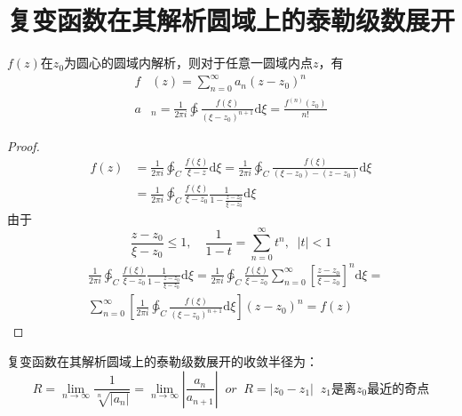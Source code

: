 \documentclass[10pt, a4paper, oneside]{ctexbook}
\def\D{\mathrm{d}}
\newcommand{\F}[1][z]
{\ensuremath{f(#1)}}
\begin{document}
\section{复变函数在其解析圆域上的泰勒级数展开}
    $\F$在$z_0$为圆心的圆域内解析，则对于任意一圆域内点$z$，有
    \begin{align*}
        f&(z)=\sum_{n=0}^\infty a_n(z-z_0)^n\\
        a&_n=\frac{1}{2\pi i}\ointctrclockwise \frac{\F[\xi]}{(\xi-z_0)^{n+1}}\D \xi=\frac{f^{(n)}(z_0)}{n!}
    \end{align*}
\begin{proof}
    \begin{align*}
        \F&=\frac{1}{2\pi i}\ointctrclockwise_C \frac{\F[\xi]}{\xi-z}\D \xi=\frac{1}{2\pi i}\ointctrclockwise_C \frac{\F[\xi]}{(\xi-z_0)-(z-z_0)}\D \xi\\
        &=\frac{1}{2\pi i}\ointctrclockwise_C \frac{\F[\xi]}{\xi-z_0}\frac{1}{1-\frac{z-z_0}{\xi-z_0}}\D \xi
    \end{align*}
    由于
    $$
    \frac{z-z_0}{\xi-z_0}\le 1,\quad\frac{1}{1-t}=\sum_{n=0}^\infty t^n,\;\; |t|<1
    $$
    \begin{align*}
    &\frac{1}{2\pi i}\ointctrclockwise_C \frac{\F[\xi]}{\xi-z_0}\frac{1}{1-\frac{z-z_0}{\xi-z_0}}\D \xi=\frac{1}{2\pi i}\ointctrclockwise_C \frac{\F[\xi]}{\xi-z_0}\sum_{n=0}^\infty \left[\frac{z-z_0}{\xi-z_0}\right]^n\D \xi=\\
    &\sum_{n=0}^\infty \left[\frac{1}{2\pi i}\ointctrclockwise_C \frac{\F[\xi]}{(\xi-z_0)^{n+1}}\D \xi\right](z-z_0)^n=\F
    \end{align*}
\end{proof}
复变函数在其解析圆域上的泰勒级数展开的收敛半径为：
$$
R=\lim_{n\to \infty}\frac{1}{\sqrt[n]{|a_n|}}=\lim_{n\to \infty} \left| \frac{a_n}{a_{n+1}} \right| \;\; or \;\; R=|z_0-z_1| \;\; \text{$z_1$是离$z_0$最近的奇点}
$$
\end{document}
